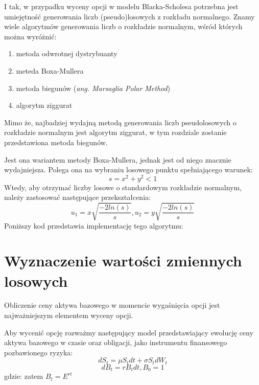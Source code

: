 \documentclass{pracamgr}
\begin{document}
I tak, w przypadku wyceny opcji w modelu Blacka-Scholesa potrzebna jest umiejętność generowania liczb (pseudo)losowych z rozkładu normalnego. Znamy wiele algorytmów generowania liczb o rozkładzie normalnym, wśród których można wyróżnić:
\begin{enumerate}
  \item metoda odwrotnej dystrybuanty
  \item meteda Boxa-Mullera
  \item metoda biegunów (\textit{ang. Marsaglia Polar Method})
  \item algorytm ziggurat
\end{enumerate}

Mimo że, najbadziej wydajną metodą generowania liczb pseudolosowych o rozkładzie normalnym jest algorytm ziggurat, w tym rozdziale zostanie przedstawiona metoda biegunów.

Jest ona wariantem metody Boxa-Mullera, jednak jest od niego znacznie wydajniejsza.
Polega ona na wybraniu losowego punktu spełniającego warunek:
\begin{equation}
  s = x^2 + y^2 < 1
\end{equation}
Wtedy, aby otrzymać liczby losowe o standardowym rozkładzie normalnym, należy zastosować następujące przekształcenia:
\begin{equation}
  u_1 = x \sqrt{\frac{-2ln(s)}{s}}, u_2 = y \sqrt{\frac{-2ln(s)}{s}}
\end{equation}
Poniższy kod przedstawia implementację tego algorytmu:


\section{Wyznaczenie wartości zmiennych losowych}

Obliczenie ceny aktywa bazowego w momencie wygaśnięcia opcji jest najważniejszym elementem 
wyceny opcji. 

Aby wycenić opcję rozważmy następujący model przedstawiający ewolucję ceny aktywa
bazowego w czasie oraz obligacji, jako instrumentu finansowego pozbawionego ryzyka:
\begin{equation}
  dS_t = \mu S_t dt + \sigma S_t d W_t 
\end{equation}
\begin{equation}
  dB_t = r B_t dt, B_0 = 1
\end{equation}
gdzie:
zatem $B_t = E^{rt}$
\end{document}
